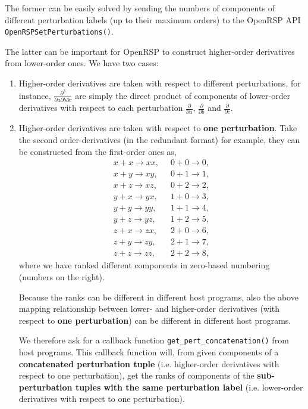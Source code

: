 The former can be easily solved by sending the numbers of components of
different perturbation labels (up to their maximum orders) to the OpenRSP API
\texttt{OpenRSPSetPerturbations()}.

The latter can be important for OpenRSP to construct higher-order derivatives
from lower-order ones. We have two cases:
\begin{enumerate}
  \item Higher-order derivatives are taken with respect to different
    perturbations, for instance, $\frac{\partial^{3}}{\partial a\partial b\partial c}$
    are simply the direct product of components of lower-order derivatives
    with respect to each perturbation $\frac{\partial}{\partial a}$,
    $\frac{\partial}{\partial b}$ and $\frac{\partial}{\partial c}$.
  \item Higher-order derivatives are taken with respect to
    \textbf{one perturbation}. Take the second order-derivatives (in the
    redundant format) for example, they can be constructed from the
    first-order ones as,
    \begin{align*}
      x+x\rightarrow xx,\;\; & 0+0\rightarrow 0,\\
      x+y\rightarrow xy,\;\; & 0+1\rightarrow 1,\\
      x+z\rightarrow xz,\;\; & 0+2\rightarrow 2,\\
      y+x\rightarrow yx,\;\; & 1+0\rightarrow 3,\\
      y+y\rightarrow yy,\;\; & 1+1\rightarrow 4,\\
      y+z\rightarrow yz,\;\; & 1+2\rightarrow 5,\\
      z+x\rightarrow zx,\;\; & 2+0\rightarrow 6,\\
      z+y\rightarrow zy,\;\; & 2+1\rightarrow 7,\\
      z+z\rightarrow zz,\;\; & 2+2\rightarrow 8,
    \end{align*}
    where we have ranked different components in zero-based numbering (numbers
    on the right).

    Because the ranks can be different in different host programs, also the
    above mapping relationship between lower- and higher-order derivatives
    (with respect to \textbf{one perturbation}) can be different in different
    host programs.

    We therefore ask for a callback function \texttt{get\_pert\_concatenation()}
    from host programs. This callback function will, from given components of
    a \textbf{concatenated perturbation tuple} (i.e. higher-order derivatives
    with respect to one perturbation), get the ranks of components of the
    \textbf{sub-perturbation tuples with the same perturbation label} (i.e.
    lower-order derivatives with respect to one perturbation).
\end{enumerate}

